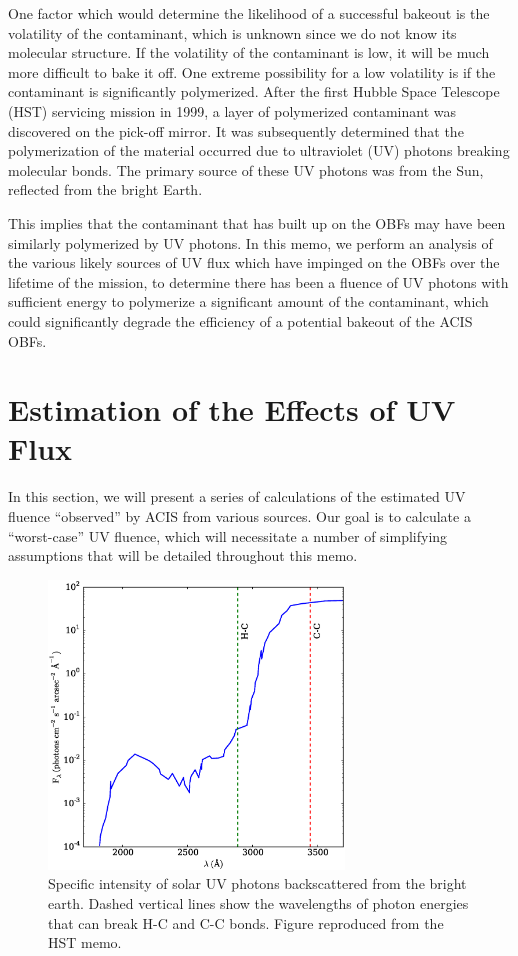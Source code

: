 \documentclass[11pt]{article}
\begin{document}
One factor which would determine the likelihood of a successful bakeout is the volatility
of the contaminant, which is unknown since we do not know its molecular structure. If the
volatility of the contaminant is low, it will be much more difficult to bake it off. One
extreme possibility for a low volatility is if the contaminant is significantly polymerized.
After the first Hubble Space Telescope (HST) servicing mission in 1999, a layer of polymerized
contaminant was discovered on the pick-off mirror. It was subsequently determined that
the polymerization of the material occurred due to ultraviolet (UV) photons breaking molecular
bonds. The primary source of these UV photons was from the Sun, reflected from the bright Earth.

This implies that the contaminant that has built up on the OBFs may have been similarly
polymerized by UV photons. In this memo, we perform an analysis of the various likely
sources of UV flux which have impinged on the OBFs over the lifetime of the mission,
to determine there has been a fluence of UV photons with sufficient energy to polymerize
a significant amount of the contaminant, which could significantly degrade the efficiency
of a potential bakeout of the ACIS OBFs.

\section{Estimation of the Effects of UV Flux}

In this section, we will present a series of calculations of the estimated UV fluence
``observed'' by ACIS from various sources. Our goal is to calculate a ``worst-case'' UV
fluence, which will necessitate a number of simplifying assumptions that will be detailed
throughout this memo.

\begin{figure}
\begin{center}
\includegraphics[width=0.7\textwidth]{bright_earth_intensity.eps}
\caption{Specific intensity of solar UV photons backscattered from the bright earth. Dashed
vertical lines show the wavelengths of photon energies that can break H-C and C-C bonds.
Figure reproduced from the HST memo.\label{fig:bright_earth_intensity}}
\end{center}
\end{figure}
\end{document}
